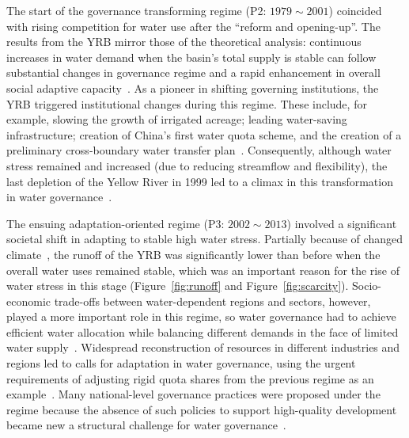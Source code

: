 The start of the governance transforming regime (P2: $1979 \sim 2001$) coincided with rising competition for water use after the ``reform and opening-up''.
The results from the YRB mirror those of the theoretical analysis: continuous increases in water demand when the basin's total supply is stable can follow substantial changes in governance regime and a rapid enhancement in overall social adaptive capacity~\cite{loch2020}.
As a pioneer in shifting governing institutions, the YRB triggered institutional changes during this regime. These include, for example, slowing the growth of irrigated acreage; leading water-saving infrastructure; creation of China's first water quota scheme, and the creation of a preliminary cross-boundary water transfer plan~\cite{wang2019e,long2020,nickum2021}.
Consequently, although water stress remained and increased (due to reducing streamflow and flexibility), the last depletion of the Yellow River in 1999 led to a climax in this transformation in water governance~\cite{wang2019e}.

The ensuing adaptation-oriented regime (P3: $2002 \sim 2013$) involved a significant societal shift in adapting to stable high water stress.
Partially because of changed climate~\cite{han2023,liu2020c}, the runoff of the YRB was significantly lower than before when the overall water uses remained stable, which was an important reason for the rise of water stress in this stage (Figure~\ref{fig:runoff} and Figure~\ref{fig:scarcity}).
Socio-economic trade-offs between water-dependent regions and sectors, however, played a more important role in this regime, so water governance had to achieve efficient water allocation while balancing different demands in the face of limited water supply~\cite{dalin2015,song2022}.
Widespread reconstruction of resources in different industries and regions led to calls for adaptation in water governance, using the urgent requirements of adjusting rigid quota shares from the previous regime as an example~\cite{wang2019e}.
Many national-level governance practices were proposed under the regime because the absence of such policies to support high-quality development became new a structural challenge for water governance~\cite{konar2019}.

